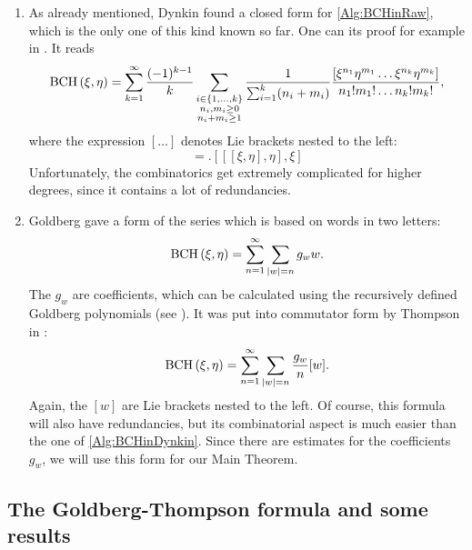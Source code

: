 \begin{enumerate}
	\item
	As already mentioned, Dynkin found a closed form for \eqref{Alg:BCHinRaw},
	which is the only one of this kind known so far. One can its proof for 
	example in \cite{jacobson:yeara}. It reads
	\begin{equation}
		\label{Alg:BCHinDynkin}
		\mathrm{BCH}\left(\xi, \eta\right)
		=
		\sum\limits_{k = 1}^{\infty} 
		\frac{ (-1)^{k - 1} }{k}
		\sum\limits_{\substack{
			i \in \{1, \ldots, k\} \\
			n_i, m_i \geq 0 \\ 
			n_i + m_i \geq 1
		}}
		\frac{1}{ \sum_{i = 1}^k(n_i + m_i) }
		\frac{ \left[
			\xi^{n_1} \eta^{m_1} \ldots \xi^{n_k} \eta^{m_k}
		\right]}
		{ n_1! m_1! \ldots n_k! m_k! },
	\end{equation}
	where the expression $[ \ldots ]$ denotes Lie brackets nested to the left:
	\begin{equation*}
		[\xi \eta \eta \xi]
		=.
		[[[\xi, \eta], \eta], \xi]
	\end{equation*}
	Unfortunately, the combinatorics get extremely complicated for higher 
	degrees, since it contains a lot of redundancies.
	
	\item
	Goldberg gave a form of the series which is based on words in two letters:
	\begin{equation}
		\mathrm{BCH}\left(\xi, \eta\right)
		=
		\sum\limits_{n = 1}^{\infty}
		\sum\limits_{|w| = n}
		g_w w.
	\end{equation}
	The $g_w$ are coefficients, which can be calculated using the recursively
	defined Goldberg polynomials (see \cite{goldberg:1956a}). It was put into 
	commutator form by Thompson in \cite{thompson:1982a}:
	\begin{equation}
		\label{Alg:BCHinGoldbergThompson}
		\mathrm{BCH}\left(\xi, \eta\right)
		=
		\sum\limits_{n = 1}^{\infty}
		\sum\limits_{|w| = n}
		\frac{g_w}{n} [w].
	\end{equation}
	Again, the $[w]$ are Lie brackets nested to the left. Of course, this 
	formula will also have redundancies, but its combinatorial aspect is much 
	easier than the one of \eqref{Alg:BCHinDynkin}. Since there are estimates 
	for the coefficients $g_w$, we will use this form for our Main Theorem.
\end{enumerate}


\subsection{The Goldberg-Thompson formula and some results}

